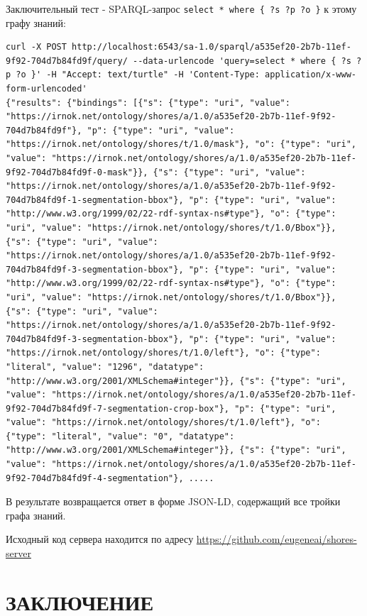 \documentclass[732,fontsize=14pt,final]{studrep}
\begin{document}
Заключительный тест - SPARQL-запрос \verb|select * where { ?s ?p ?o }| к этому графу знаний:
\begin{verbatim}
curl -X POST http://localhost:6543/sa-1.0/sparql/a535ef20-2b7b-11ef-9f92-704d7b84fd9f/query/ --data-urlencode 'query=select * where { ?s ?p ?o }' -H "Accept: text/turtle" -H 'Content-Type: application/x-www-form-urlencoded'
{"results": {"bindings": [{"s": {"type": "uri", "value": "https://irnok.net/ontology/shores/a/1.0/a535ef20-2b7b-11ef-9f92-704d7b84fd9f"}, "p": {"type": "uri", "value": "https://irnok.net/ontology/shores/t/1.0/mask"}, "o": {"type": "uri", "value": "https://irnok.net/ontology/shores/a/1.0/a535ef20-2b7b-11ef-9f92-704d7b84fd9f-0-mask"}}, {"s": {"type": "uri", "value": "https://irnok.net/ontology/shores/a/1.0/a535ef20-2b7b-11ef-9f92-704d7b84fd9f-1-segmentation-bbox"}, "p": {"type": "uri", "value": "http://www.w3.org/1999/02/22-rdf-syntax-ns#type"}, "o": {"type": "uri", "value": "https://irnok.net/ontology/shores/t/1.0/Bbox"}}, {"s": {"type": "uri", "value": "https://irnok.net/ontology/shores/a/1.0/a535ef20-2b7b-11ef-9f92-704d7b84fd9f-3-segmentation-bbox"}, "p": {"type": "uri", "value": "http://www.w3.org/1999/02/22-rdf-syntax-ns#type"}, "o": {"type": "uri", "value": "https://irnok.net/ontology/shores/t/1.0/Bbox"}}, {"s": {"type": "uri", "value": "https://irnok.net/ontology/shores/a/1.0/a535ef20-2b7b-11ef-9f92-704d7b84fd9f-3-segmentation-bbox"}, "p": {"type": "uri", "value": "https://irnok.net/ontology/shores/t/1.0/left"}, "o": {"type": "literal", "value": "1296", "datatype": "http://www.w3.org/2001/XMLSchema#integer"}}, {"s": {"type": "uri", "value": "https://irnok.net/ontology/shores/a/1.0/a535ef20-2b7b-11ef-9f92-704d7b84fd9f-7-segmentation-crop-box"}, "p": {"type": "uri", "value": "https://irnok.net/ontology/shores/t/1.0/left"}, "o": {"type": "literal", "value": "0", "datatype": "http://www.w3.org/2001/XMLSchema#integer"}}, {"s": {"type": "uri", "value": "https://irnok.net/ontology/shores/a/1.0/a535ef20-2b7b-11ef-9f92-704d7b84fd9f-4-segmentation"}, .....
\end{verbatim}
В результате возвращается ответ в форме JSON-LD, содержащий все тройки графа знаний.

Исходный код сервера находится по адресу \url{https://github.com/eugeneai/shores-server}

\chapter*{ЗАКЛЮЧЕНИЕ}
\end{document}
